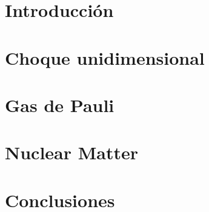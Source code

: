 \documentclass[twoside, 12pt]{article}
\numberwithin{figure}{section}
\begin{document}


\newpage
 


\newpage

\tableofcontents

\newpage
\setcounter{page}{1}
\section{Introducción}
 

\newpage

\section{Choque unidimensional}{\label{sec:choque1D}}


\newpage

\section{Gas de Pauli}{\label{sec:pauli_gas}}


\newpage

\section{Nuclear Matter}{\label{sec:NM}}


\newpage

\section{Conclusiones}{\label{sec:conc}}


\newpage
\appendix


\newpage


  
\printindex
\end{document}
